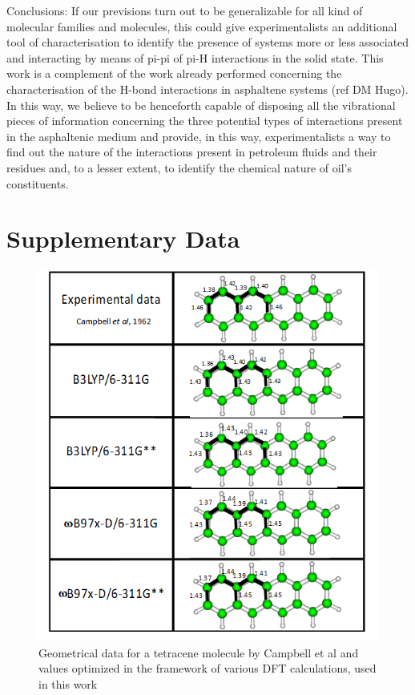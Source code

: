  	Conclusions: If our previsions turn out to be generalizable for all kind of molecular families and molecules, this could give experimentalists an additional tool of characterisation to identify the presence of systems more or less associated and interacting by means of pi-pi of pi-H interactions in the solid state. This work is a complement of the work already performed concerning the characterisation of the H-bond interactions in asphaltene systems (ref DM Hugo). In this way, we believe to be henceforth capable of disposing all the vibrational pieces of information concerning the three potential types of interactions present in the asphaltenic medium and provide, in this way, experimentalists a way to find out the nature of the interactions present in petroleum fluids and their residues and, to a lesser extent, to identify the chemical nature of oil’s constituents. 
 
 \newpage
 
 \section*{Supplementary Data}
 
 \begin{figure}[h]
 	\centering
 	\includegraphics[scale=0.8]{image/geometrical-data}
 	\caption[Geometrical data for a tetracene molecule]{Geometrical data for a tetracene molecule by Campbell et al \cite{campbell1962crystal} and values optimized in the framework of various DFT calculations, used in this work}
 \end{figure}
 
